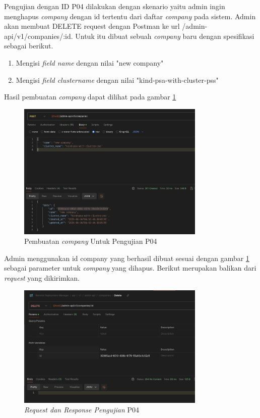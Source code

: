 Pengujian dengan ID P04 dilakukan dengan skenario yaitu admin ingin menghapus \textit{company} dengan id tertentu dari daftar \textit{company} pada sistem. Admin akan membuat DELETE request dengan Postman ke url /admin-api/v1/companies/:id. Untuk itu dibuat sebuah \textit{company} baru dengan spesifikasi sebagai berikut.

\begin{enumerate}
  \item Mengisi \textit{field name} dengan nilai "new company"
  \item Mengisi \textit{field cluster\textunderscore name} dengan nilai "kind-psa-with-cluster-pss"
\end{enumerate}

Hasil pembuatan \textit{company} dapat dilihat pada gambar \ref{fig:pengujian-p04-1}

\begin{figure}[ht]
  \centering
  \includegraphics[width=0.8\textwidth]{resources/chapter-4/pengujian/p04-1.jpg}
  \caption{Pembuatan \textit{company} Untuk Pengujian P04}
  \label{fig:pengujian-p04-1}
\end{figure}


Admin menggunakan id company yang berhasil dibuat sesuai dengan gambar \ref{fig:pengujian-p04-1} sebagai parameter untuk \textit{company} yang dihapus. Berikut merupakan balikan dari \textit{request} yang dikirimkan.

\begin{figure}[ht]
  \centering
  \includegraphics[width=0.8\textwidth]{resources/chapter-4/pengujian/p04.jpg}
  \caption{\textit{Request dan Response Pengujian} P04}
  \label{fig:pengujian-p04}
\end{figure}

